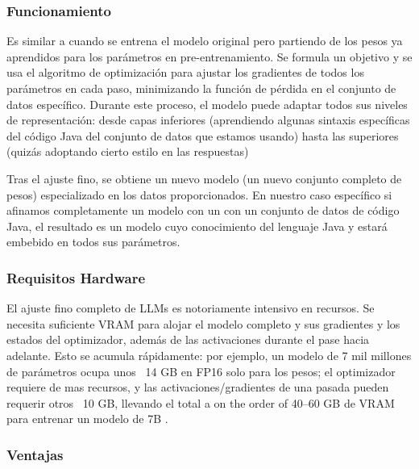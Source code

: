 \subsubsection{Funcionamiento}

Es similar a cuando se entrena el modelo original pero partiendo de los pesos ya aprendidos para los parámetros en pre-entrenamiento. Se formula un objetivo  y se usa el algoritmo de optimización  para ajustar los gradientes de todos los parámetros en cada paso, minimizando la función de pérdida en el conjunto de datos específico. Durante este proceso, el modelo puede adaptar todos sus niveles de representación: desde capas inferiores (aprendiendo algunas sintaxis específicas del código Java del conjunto de datos que estamos usando) hasta las superiores (quizás adoptando cierto estilo en las respuestas)

Tras el ajuste fino, se obtiene un nuevo modelo (un nuevo conjunto completo de pesos) especializado en los datos proporcionados. En nuestro caso específico si afinamos completamente un modelo con un con un conjunto de datos de código Java, el resultado es un modelo cuyo conocimiento del lenguaje Java y estará embebido en todos sus parámetros.

\subsubsection{Requisitos Hardware}
El ajuste fino completo de LLMs es notoriamente intensivo en recursos. Se necesita suficiente VRAM  para alojar el modelo completo y sus gradientes y los estados del optimizador, además de las activaciones durante el pase hacia adelante. Esto se acumula rápidamente: por ejemplo, un modelo de 7 mil millones de parámetros ocupa unos ~14 GB en FP16 solo para los pesos; el optimizador requiere de mas recursos, y las activaciones/gradientes de una pasada pueden requerir otros ~10 GB, llevando el total a on the order of 40–60 GB de VRAM para entrenar un modelo de 7B \cite{Gpu-Finetuning}.

\subsubsection{Ventajas}

